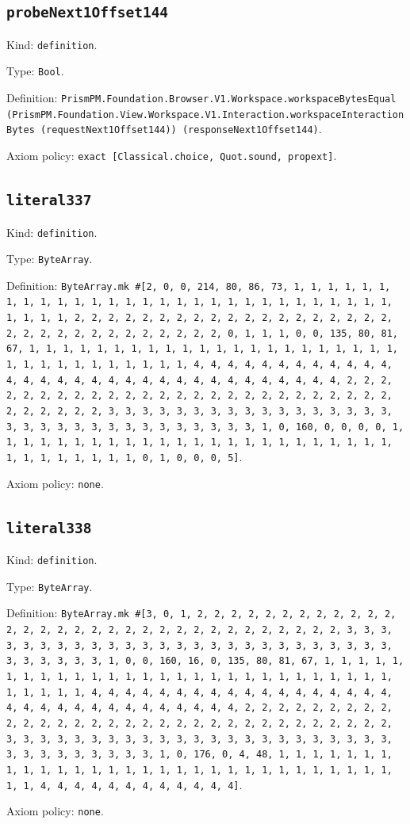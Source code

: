 \documentclass[11pt]{article}
\begin{document}
\subsection*{\texttt{probeNext1Offset144}}
\noindent Kind: \texttt{definition}.\par
\noindent Type: \texttt{Bool}.\par
\noindent Definition: \texttt{PrismPM.Foundation.Browser.V1.Workspace.workspaceBytesEqual (PrismPM.Foundation.View.Workspace.V1.Interaction.workspaceInteractionBytes (requestNext1Offset144)) (responseNext1Offset144)}.\par
\noindent Axiom policy: \texttt{exact [Classical.choice, Quot.sound, propext]}.\par
\subsection*{\texttt{literal337}}
\noindent Kind: \texttt{definition}.\par
\noindent Type: \texttt{ByteArray}.\par
\noindent Definition: \texttt{ByteArray.mk \#[2, 0, 0, 214, 80, 86, 73, 1, 1, 1, 1, 1, 1, 1, 1, 1, 1, 1, 1, 1, 1, 1, 1, 1, 1, 1, 1, 1, 1, 1, 1, 1, 1, 1, 1, 1, 1, 1, 1, 1, 2, 2, 2, 2, 2, 2, 2, 2, 2, 2, 2, 2, 2, 2, 2, 2, 2, 2, 2, 2, 2, 2, 2, 2, 2, 2, 2, 2, 2, 2, 2, 2, 0, 1, 1, 1, 0, 0, 135, 80, 81, 67, 1, 1, 1, 1, 1, 1, 1, 1, 1, 1, 1, 1, 1, 1, 1, 1, 1, 1, 1, 1, 1, 1, 1, 1, 1, 1, 1, 1, 1, 1, 1, 1, 1, 4, 4, 4, 4, 4, 4, 4, 4, 4, 4, 4, 4, 4, 4, 4, 4, 4, 4, 4, 4, 4, 4, 4, 4, 4, 4, 4, 4, 4, 4, 4, 4, 2, 2, 2, 2, 2, 2, 2, 2, 2, 2, 2, 2, 2, 2, 2, 2, 2, 2, 2, 2, 2, 2, 2, 2, 2, 2, 2, 2, 2, 2, 2, 2, 3, 3, 3, 3, 3, 3, 3, 3, 3, 3, 3, 3, 3, 3, 3, 3, 3, 3, 3, 3, 3, 3, 3, 3, 3, 3, 3, 3, 3, 3, 3, 3, 1, 0, 160, 0, 0, 0, 0, 1, 1, 1, 1, 1, 1, 1, 1, 1, 1, 1, 1, 1, 1, 1, 1, 1, 1, 1, 1, 1, 1, 1, 1, 1, 1, 1, 1, 1, 1, 1, 1, 0, 1, 0, 0, 0, 5]}.\par
\noindent Axiom policy: \texttt{none}.\par
\subsection*{\texttt{literal338}}
\noindent Kind: \texttt{definition}.\par
\noindent Type: \texttt{ByteArray}.\par
\noindent Definition: \texttt{ByteArray.mk \#[3, 0, 1, 2, 2, 2, 2, 2, 2, 2, 2, 2, 2, 2, 2, 2, 2, 2, 2, 2, 2, 2, 2, 2, 2, 2, 2, 2, 2, 2, 2, 2, 2, 2, 2, 3, 3, 3, 3, 3, 3, 3, 3, 3, 3, 3, 3, 3, 3, 3, 3, 3, 3, 3, 3, 3, 3, 3, 3, 3, 3, 3, 3, 3, 3, 3, 3, 1, 0, 0, 160, 16, 0, 135, 80, 81, 67, 1, 1, 1, 1, 1, 1, 1, 1, 1, 1, 1, 1, 1, 1, 1, 1, 1, 1, 1, 1, 1, 1, 1, 1, 1, 1, 1, 1, 1, 1, 1, 1, 1, 4, 4, 4, 4, 4, 4, 4, 4, 4, 4, 4, 4, 4, 4, 4, 4, 4, 4, 4, 4, 4, 4, 4, 4, 4, 4, 4, 4, 4, 4, 4, 4, 2, 2, 2, 2, 2, 2, 2, 2, 2, 2, 2, 2, 2, 2, 2, 2, 2, 2, 2, 2, 2, 2, 2, 2, 2, 2, 2, 2, 2, 2, 2, 2, 3, 3, 3, 3, 3, 3, 3, 3, 3, 3, 3, 3, 3, 3, 3, 3, 3, 3, 3, 3, 3, 3, 3, 3, 3, 3, 3, 3, 3, 3, 3, 3, 1, 0, 176, 0, 4, 48, 1, 1, 1, 1, 1, 1, 1, 1, 1, 1, 1, 1, 1, 1, 1, 1, 1, 1, 1, 1, 1, 1, 1, 1, 1, 1, 1, 1, 1, 1, 1, 1, 4, 4, 4, 4, 4, 4, 4, 4, 4, 4, 4, 4]}.\par
\noindent Axiom policy: \texttt{none}.\par
\end{document}
